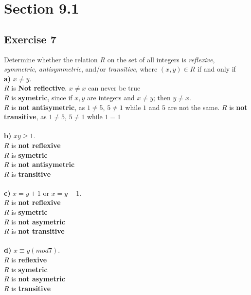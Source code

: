 \documentclass[12pt]{article}
\begin{document}
    \section{Section 9.1}
    \subsection{Exercise 7}
    Determine whether the relation $R$ on the set of all integers is \textit{reflexive}, \textit{symmetric}, \textit{antisymmetric}, and/or \textit{transitive}, where $(x,y) \in R$ if and only if\\
    \textbf{a)} $ x \neq y$.\\
        $R$ is \textbf{Not reflective}. $x \neq x$ can never be true\\
        $R$ is \textbf{symetric}, since if $x, y$ are integers and $ x \neq y$; then $ y \neq x$. \\
        $R$ is \textbf{not antisymetric}, as $1\neq 5$, $5 \neq 1$ while $1$ and $5$ are not the same. 
        $R$ is \textbf{not transitive}, as $1\neq 5$, $5 \neq 1$ while $1 = 1$\\
        \\
    \textbf{b)} $ xy \geq 1$.\\
        $R$ is \textbf{not reflexive} \\
        $R$ is \textbf{symetric} \\
        $R$ is \textbf{not antisymetric} \\
        $R$ is \textbf{transitive} \\
        \\
    \textbf{c)} $ x=y + 1$ or $ x=y-1$.\\
        $R$ is \textbf{not reflexive} \\
        $R$ is \textbf{symetric} \\
        $R$ is \textbf{not asymetric} \\
        $R$ is \textbf{not transitive} \\
        \\
    \textbf{d)} $ x \equiv y (mod 7) $.\\
        $R$ is \textbf{reflexive} \\
        $R$ is \textbf{symetric} \\
        $R$ is \textbf{not asymetric} \\
        $R$ is \textbf{transitive} \\
        \\
\end{document}
